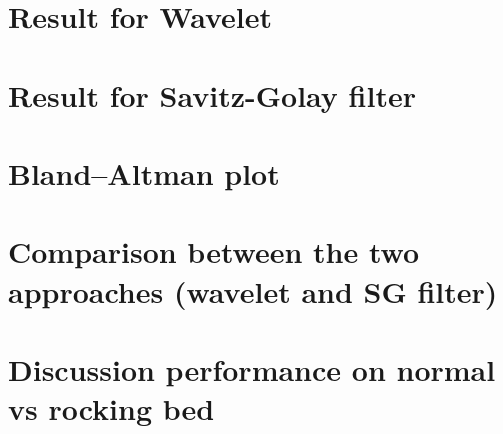 


\section{Result for Wavelet }
\section{Result for Savitz-Golay filter }
\section{Bland–Altman plot}
\section{Comparison between the two approaches (wavelet and SG filter)}
\section{Discussion performance on normal vs rocking bed }